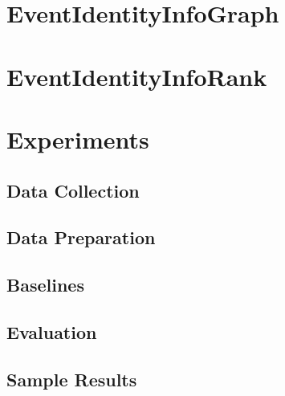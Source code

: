 \section{EventIdentityInfoGraph}

\section{EventIdentityInfoRank}

\section{Experiments}

\subsection{Data Collection}

\subsection{Data Preparation}

\subsection{Baselines}

\subsection{Evaluation}

\subsection{Sample Results}